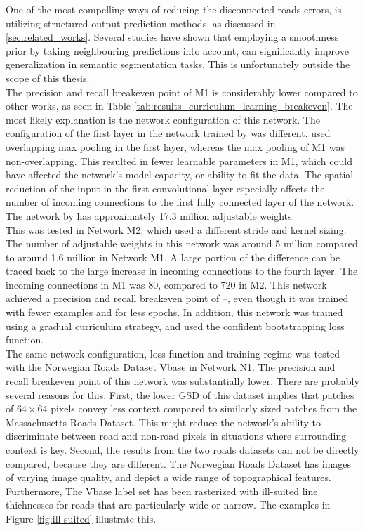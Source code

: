 One of the most compelling ways of reducing the disconnected roads errors, is utilizing structured output prediction methods, as discussed in \ref{sec:related_works}. Several studies \citep{Kluckner_semantic_height} \citep{LeCun_semantic} \citep{Mnih_roads_high_res_aerial_images} have shown that employing a smoothness prior by taking neighbouring predictions into account, can significantly improve generalization in semantic segmentation tasks. This is unfortunately outside the scope of this thesis.\\

The precision and recall breakeven point of M1 is considerably lower compared to other works, as seen in Table \ref{tab:results_curriculum_learning_breakeven}. The most likely explanation is the network configuration of this network. The configuration of the first layer in the network trained by \citep{MnihThesis} was different. \citep{MnihThesis} used overlapping max pooling in the first layer, whereas the max pooling of M1 was non-overlapping. This resulted in fewer learnable parameters in M1, which could have affected the network's model capacity, or ability to fit the data. The spatial reduction of the input in the first convolutional layer especially affects the number of incoming connections to the first fully connected layer of the network.  The network by \cite{MnihThesis} has approximately 17.3 million adjustable weights.\\

This was tested in Network M2, which used a different stride and kernel sizing. The number of adjustable weights in this network was around 5 million compared to around 1.6 million in Network M1. A large portion of the difference can be traced back to the large increase in incoming connections to the fourth layer. The incoming connections in M1 was 80, compared to 720 in M2. This network achieved a precision and recall breakeven point of --, even though it was trained with fewer examples and for less epochs. In addition, this network was trained using a gradual curriculum strategy, and used the confident bootstrapping loss function. \\

The same network configuration, loss function and training regime was tested with the Norwegian Roads Dataset Vbase in Network N1. The precision and recall breakeven point of this network was substantially lower. There are probably several reasons for this. First, the lower \ac{GSD} of this dataset implies that patches of $64 \times 64$ pixels convey less context compared to similarly sized patches from the Massachusetts Roads Dataset. This might reduce the network's ability to discriminate between road and non-road pixels in situations where surrounding context is key. Second, the results from the two roads datasets can not be directly compared, because they are different. The Norwegian Roads Dataset has images of varying image quality, and depict a wide range of topographical features. Furthermore, The Vbase label set has been rasterized with ill-suited line thichnesses for roads that are particularly wide or narrow. The examples in Figure \ref{fig:ill-suited} illustrate this. 

